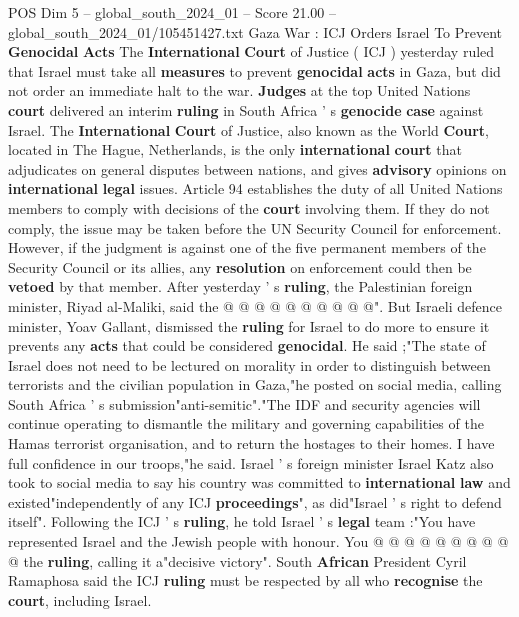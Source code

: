 \begin{textsample}{POS Dim 5 – global\_south\_2024\_01 – Score 21.00 – global\_south\_2024\_01/105451427.txt}  \label{ex:f5_pos_011}
Gaza War : ICJ Orders Israel To Prevent \textbf{Genocidal} \textbf{Acts} The \textbf{International} \textbf{Court} of Justice ( ICJ ) yesterday ruled that Israel must take all \textbf{measures} to prevent \textbf{genocidal} \textbf{acts} in Gaza, but did not order an immediate halt to the war. \textbf{Judges} at the top United Nations \textbf{court} delivered an interim \textbf{ruling} in South Africa ' s \textbf{genocide} \textbf{case} against Israel.
The \textbf{International} \textbf{Court} of Justice, also known as the World \textbf{Court}, located in The Hague, Netherlands, is the only \textbf{international} \textbf{court} that adjudicates on general disputes between nations, and gives \textbf{advisory} opinions on \textbf{international} \textbf{legal} issues.
Article 94 establishes the duty of all United Nations members to comply with decisions of the \textbf{court} involving them.
If they do not comply, the issue may be taken before the UN Security Council for enforcement.
However, if the judgment is against one of the five permanent members of the Security Council or its allies, any \textbf{resolution} on enforcement could then be \textbf{vetoed} by that member.
After yesterday ' s \textbf{ruling}, the Palestinian foreign minister, Riyad al-Maliki, said the @ @ @ @ @ @ @ @ @ @".
But Israeli defence minister, Yoav Gallant, dismissed the \textbf{ruling} for Israel to do more to ensure it prevents any \textbf{acts} that could be considered \textbf{genocidal}.
He said ;"The state of Israel does not need to be lectured on morality in order to distinguish between terrorists and the civilian population in Gaza,"he posted on social media, calling South Africa ' s submission"anti-semitic"."The IDF and security agencies will continue operating to dismantle the military and governing capabilities of the Hamas terrorist organisation, and to return the hostages to their homes.
I have full confidence in our troops,"he said.
Israel ' s foreign minister Israel Katz also took to social media to say his country was committed to \textbf{international} \textbf{law} and existed"independently of any ICJ \textbf{proceedings}", as did"Israel ' s right to defend itself".
Following the ICJ ' s \textbf{ruling}, he told Israel ' s \textbf{legal} team :"You have represented Israel and the Jewish people with honour.
You @ @ @ @ @ @ @ @ @ @ the \textbf{ruling}, calling it a"decisive victory".
South \textbf{African} President Cyril Ramaphosa said the ICJ \textbf{ruling} must be respected by all who \textbf{recognise} the \textbf{court}, including Israel.

\end{textsample}
